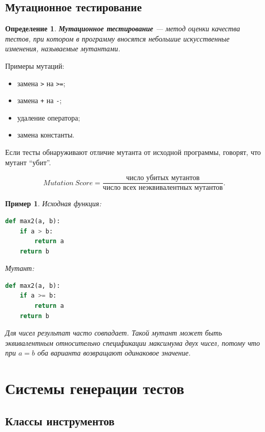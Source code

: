 \documentclass[12pt,a4paper]{article}
\newtheorem{definition}{Определение}
\newtheorem{example}{Пример}
\begin{document}
\subsection{Мутационное тестирование}

\begin{definition}
\textbf{Мутационное тестирование} --- метод оценки качества тестов, при котором в программу вносятся небольшие искусственные изменения, называемые мутантами.
\end{definition}

Примеры мутаций:

\begin{itemize}
    \item замена \texttt{>} на \texttt{>=};
    \item замена \texttt{+} на \texttt{-};
    \item удаление оператора;
    \item замена константы.
\end{itemize}

Если тесты обнаруживают отличие мутанта от исходной программы, говорят, что мутант ``убит''.

\[
Mutation\ Score =
\frac{\text{число убитых мутантов}}
{\text{число всех неэквивалентных мутантов}}.
\]

\begin{example}
Исходная функция:

\begin{lstlisting}[language=Python]
def max2(a, b):
    if a > b:
        return a
    return b
\end{lstlisting}

Мутант:

\begin{lstlisting}[language=Python]
def max2(a, b):
    if a >= b:
        return a
    return b
\end{lstlisting}

Для чисел результат часто совпадает. Такой мутант может быть эквивалентным относительно спецификации максимума двух чисел, потому что при $a=b$ оба варианта возвращают одинаковое значение.
\end{example}

\section{Системы генерации тестов}

\subsection{Классы инструментов}
\end{document}

